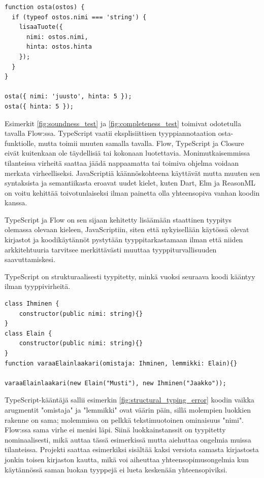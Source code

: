 \begin{minipage}{\linewidth}
\begin{lstlisting}[caption={Toimiva JavaScript-ohjelma: Virheelliseltä kutsulta on suojauduttu tarkistuksella.}]
function osta(ostos) {
  if (typeof ostos.nimi === 'string') {
    lisaaTuote({
      nimi: ostos.nimi,
      hinta: ostos.hinta
    });
  }
}

osta({ nimi: 'juusto', hinta: 5 });
osta({ hinta: 5 });
\end{lstlisting}
\label{fig:completeness_test}
\end{minipage}
Esimerkit \ref{fig:soundness_test} ja \ref{fig:completeness_test} toimivat
odotetulla tavalla Flow:ssa. TypeScript vaatii eksplisiittisen tyyppiannotaation
osta-funktiolle, mutta toimii muuten samalla tavalla. Flow, TypeScript ja
Closure eivät kuitenkaan ole täydellisiä tai kokonaan luotettavia.
Monimutkaisemmissa tilanteissa virheitä saattaa jäädä nappaamatta tai toimiva
ohjelma voidaan merkata virheelliseksi. JavaScriptiä käännöskohteena käyttävät
mutta muuten sen syntaksista ja semantiikasta eroavat uudet kielet,
kuten Dart, Elm ja ReasonML on voitu kehittää toivotunlaiseksi ilman painetta olla
yhteensopiva vanhan koodin kanssa.

TypeScript ja Flow on sen sijaan kehitetty lisäämään staattinen tyypitys
olemassa olevaan kieleen, JavaScriptiin, siten että nykyisellään käytössä
olevat kirjastot ja koodikäytännöt pystytään tyyppitarkastamaan ilman että
niiden arkkitehtuuria tarvitsee merkittävästi muuttaa tyyppiturvallisuuden
saavuttamiskesi.

TypeScript on strukturaalisesti tyypitetty, minkä vuoksi seuraava koodi kääntyy
ilman tyyppivirheitä.

\begin{minipage}{\linewidth}
\begin{lstlisting}[caption={Loogisen virheen sisältävä, mutta ilman virheitä kääntyvä TypeScript-ohjelma.}]
class Ihminen {
    constructor(public nimi: string){}
}
class Elain {
    constructor(public nimi: string){}
}
function varaaElainlaakari(omistaja: Ihminen, lemmikki: Elain){}

varaaElainlaakari(new Elain("Musti"), new Ihminen("Jaakko"));
\end{lstlisting}
\label{fig:structural_typing_error}
\end{minipage}
TypeScript-kääntäjä sallii esimerkin \ref{fig:structural_typing_error} koodin
vaikka arugmentit "omistaja" ja "lemmikki" ovat väärin päin, sillä
molempien luokkien rakenne on sama; molemmissa on pelkkä tekstimuotoinen
ominaisuus "nimi". Flow:ssa sama virhe ei menisi läpi. Siinä luokkainstanssit
on tyypitetty nominaalisesti, mikä auttaa tässä esimerkissä mutta aiehuttaa ongelmia
muissa tilanteissa. Projekti saattaa esimerkiksi sisältää kaksi versiota samasta
kirjastosta jonkin toisen kirjaston kautta, mikä voi aiheuttaa yhteensopimusongelmia
kun käytännössä saman luokan tyyppejä ei lueta keskenään yhteensopiviksi. 